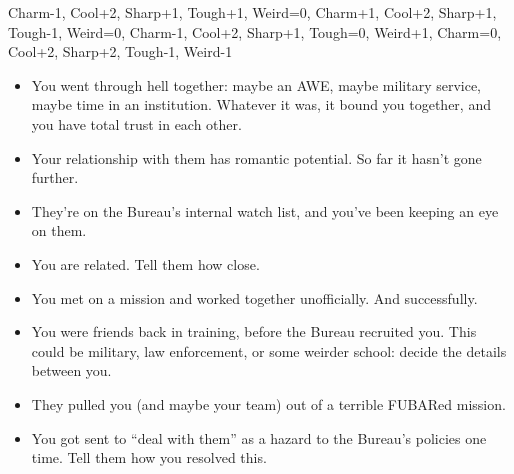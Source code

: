 {{    {Charm-1, Cool+2, Sharp+1, Tough+1, Weird=0},
    {Charm+1, Cool+2, Sharp+1, Tough-1, Weird=0},
    {Charm-1, Cool+2, Sharp+1, Tough=0, Weird+1},
    {Charm=0, Cool+2, Sharp+2, Tough-1, Weird-1}}
%
%
\brln
%
\begin{history}
\begin{itemize}
\item You went through hell together: maybe an AWE, maybe military service, maybe time in an institution. Whatever it was, it bound you together, and you have total trust in each other.
\item Your relationship with them has romantic potential. So far it hasn’t gone further.
\item They’re on the Bureau’s internal watch list, and you’ve been keeping an eye on them.
\item You are related. Tell them how close.
\item You met on a mission and worked together unofficially. And successfully.
\item You were friends back in training, before the Bureau recruited you. This could be military, law enforcement, or some weirder school: decide the details between you.
\item They pulled you (and maybe your team) out of a terrible FUBARed mission.
\item You got sent to “deal with them” as a hazard to the Bureau’s policies one time. Tell them how you resolved this.
\end{itemize}
\end{history}
%
}{%
%
\levelingup
%
%
%
}%
